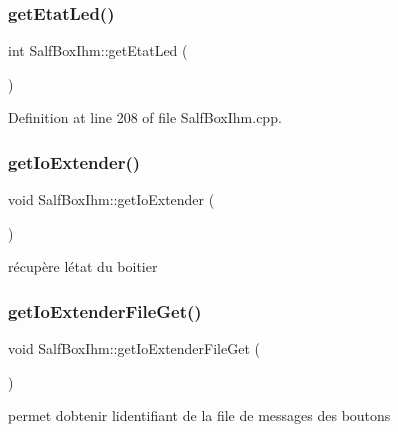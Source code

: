 \subsubsection{\texorpdfstring{get\+Etat\+Led()}{getEtatLed()}}
{\footnotesize\ttfamily int Salf\+Box\+Ihm\+::get\+Etat\+Led (\begin{DoxyParamCaption}{ }\end{DoxyParamCaption})\hspace{0.3cm}{\ttfamily [static]}}



Definition at line 208 of file Salf\+Box\+Ihm.\+cpp.

\mbox{\label{class_salf_box_ihm_ab6f403e3660ecddbabb147a3d194d1e1}} 
\subsubsection{\texorpdfstring{get\+Io\+Extender()}{getIoExtender()}}
{\footnotesize\ttfamily void Salf\+Box\+Ihm\+::get\+Io\+Extender (\begin{DoxyParamCaption}{ }\end{DoxyParamCaption})\hspace{0.3cm}{\ttfamily [static]}}



récupère l\textquotesingle{}état du boitier 

\mbox{\label{class_salf_box_ihm_aebeee5ca5aa174e6d79262c6f59dffa7}} 
\subsubsection{\texorpdfstring{get\+Io\+Extender\+File\+Get()}{getIoExtenderFileGet()}}
{\footnotesize\ttfamily void Salf\+Box\+Ihm\+::get\+Io\+Extender\+File\+Get (\begin{DoxyParamCaption}{ }\end{DoxyParamCaption})\hspace{0.3cm}{\ttfamily [static]}}



permet d\textquotesingle{}obtenir l\textquotesingle{}identifiant de la file de messages des boutons 

